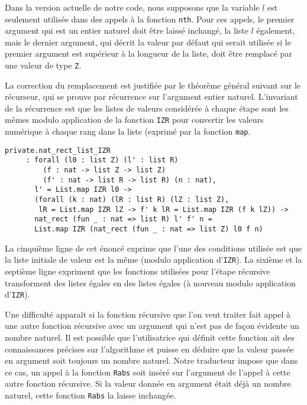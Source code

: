\documentclass{modjflart}
\begin{document}
Dans la version actuelle de notre code, nous supposons que la variable \(l\) est
seulement utilisée dans des appels à la fonction \texttt{nth}.  Pour ces
appels, le premier argument qui est un entier naturel doit être laissé
inchangé, la liste \(l\) également, mais le dernier argument, qui
décrit la valeur par défaut qui serait utilisée si le premier
argument est supérieur à la longueur de la liste, doit être remplacé
par une valeur de type \texttt{Z}.

La correction du remplacement est justifiée par le théorème général
suivant sur le récurseur, qui se prouve par récurrence sur l'argument
entier naturel.  L'invariant de la récurrence est que les listes de
valeurs considérée à chaque étape sont les mêmes modulo application de
la fonction \texttt{IZR} pour convertir les valeurs numérique à chaque
rang dans la liste (exprimé par la fonction \texttt{map}.

\begin{verbatim}
private.nat_rect_list_IZR
     : forall (l0 : list Z) (l' : list R) 
         (f : nat -> list Z -> list Z)
         (f' : nat -> list R -> list R) (n : nat),
       l' = List.map IZR l0 ->
       (forall (k : nat) (lR : list R) (lZ : list Z),
        lR = List.map IZR lZ -> f' k lR = List.map IZR (f k lZ)) ->
       nat_rect (fun _ : nat => list R) l' f' n =
       List.map IZR (nat_rect (fun _ : nat => list Z) l0 f n)
\end{verbatim}
La cinquième ligne de cet énoncé exprime que l'une des conditions utilisée
est que la liste initiale de valeur est la même (modulo application
d'\texttt{IZR}).
La sixième et la septième ligne expriment que les fonctions
utilisées pour l'étape récursive transforment des listes
égales en des listes égales (à nouveau modulo application
d'\texttt{IZR}).

Une difficulté apparaît si la fonction récursive que l'on veut traiter
fait appel à une autre fonction récursive avec un argument qui n'est
pas de façon évidente un nombre naturel.  Il est possible que
l'utilisatrice qui définit cette fonction ait des connaissances
précises sur l'algorithme et puisse en déduire que la valeur passée
en argument soit toujours un nombre naturel.  Notre traducteur impose
que dans ce cas, un appel à la fonction \texttt{Rabs} soit inséré sur
l'argument de l'appel à cette autre fonction récursive.  Si la valeur
donnée en argument était déjà un nombre naturel, cette fonction
\texttt{Rabs} la laisse inchangée.
\end{document}
